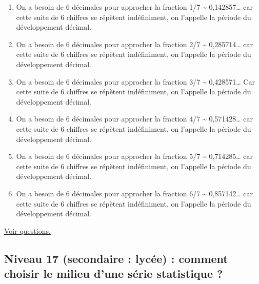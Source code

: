 \documentclass[11pt]{article}
\begin{document}
\begin{enumerate}
\item On a besoin de 6 décimales pour approcher la fraction 
     1/7 \textasciitilde{} 0,142857\ldots{}
     car cette suite de 6 chiffres se répètent indéfiniment, on
l'appelle la période du développement décimal.
\item On a besoin de 6 décimales pour approcher la fraction 
     2/7 \textasciitilde{} 0,285714\ldots{} 
     car cette suite de 6 chiffres se répètent indéfiniment, on
l'appelle la période du développement décimal.
\item On a besoin de 6 décimales pour approcher la fraction 
     3/7 \textasciitilde{} 0,428571\ldots{}
     Car cette suite de 6 chiffres se répètent indéfiniment, on
l'appelle la période du développement décimal.
\item On a besoin de 6 décimales pour approcher la fraction 
     4/7 \textasciitilde{}  0,571428\ldots{}
     car cette suite de 6 chiffres se répètent indéfiniment, on
l'appelle la période du développement décimal.
\item On a besoin de 6 décimales pour approcher la fraction 
     5/7 \textasciitilde{}  0,714285\ldots{}
     car cette suite de 6 chiffres se répètent indéfiniment, on
l'appelle la période du développement décimal.
\item On a besoin de 6 décimales pour approcher la fraction 
     6/7 \textasciitilde{}  0,857142\ldots{}
     car cette suite de 6 chiffres se répètent indéfiniment, on
l'appelle la période du développement décimal.
\end{enumerate}


\hyperref[orge6e979c]{Voir questions.}


\newpage


\subsection{Niveau 17 (secondaire : lycée) : comment choisir le milieu d'une série statistique ?}
\label{sec:org761ff6c}

\label{org1a0edcc}
\end{document}
